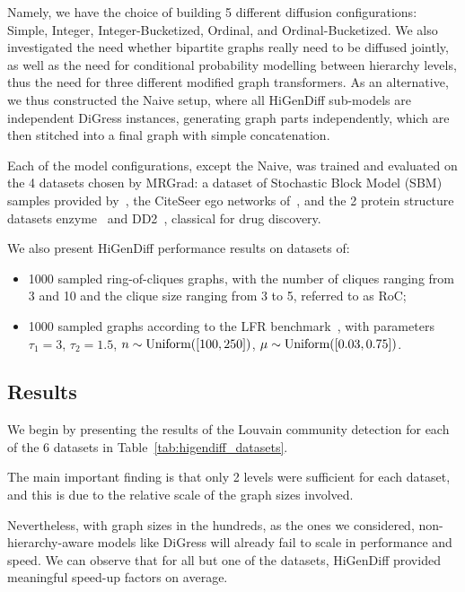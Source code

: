Namely, we have the choice of building 5 different diffusion configurations: Simple, Integer, Integer-Bucketized, Ordinal, and Ordinal-Bucketized. We also investigated the need whether bipartite graphs really need to be diffused jointly, as well as the need for conditional probability modelling between hierarchy levels, thus the need for three different modified graph transformers. As an alternative, we thus constructed the Naive setup, where all HiGenDiff sub-models are independent DiGress instances, generating graph parts independently, which are then stitched into a final graph with simple concatenation.

Each of the model configurations, except the Naive, was trained and evaluated on the 4 datasets chosen by MRGrad: a dataset of Stochastic Block Model (SBM) samples provided by~\cite{martinkus_spectre_2022}, the CiteSeer ego networks of~\cite{sen_collective_2008}, and the 2 protein structure datasets enzyme~\cite{schomburg_brenda_2004} and DD2~\cite{dobson_distinguishing_2003}, classical for drug discovery. 

We also present HiGenDiff performance results on datasets of:
\begin{itemize}
    \item 1000 sampled ring-of-cliques graphs, with the number of cliques ranging from 3 and 10 and the clique size ranging from 3 to 5, referred to as RoC;
    \item 1000 sampled graphs according to the LFR benchmark~\cite{lancichinetti_finding_2011}, with parameters $\tau_1=3$, $\tau_2=1.5$, $n \sim \text{Uniform}\mathopen{}\left(\mathopen{}\left[100, 250\right]\right)$, $\mu \sim \text{Uniform}\mathopen{}\left(\mathopen{}\left[0.03, 0.75\right]\right)$.
\end{itemize}

\subsection{Results}

We begin by presenting the results of the Louvain community detection for each of the 6 datasets in Table~\ref{tab:higendiff_datasets}. 

The main important finding is that only 2 levels were sufficient for each dataset, and this is due to the relative scale of the graph sizes involved. 

Nevertheless, with graph sizes in the hundreds, as the ones we considered, non-hierarchy-aware models like DiGress will already fail to scale in performance and speed. We can observe that for all but one of the datasets, HiGenDiff provided meaningful speed-up factors on average. 

